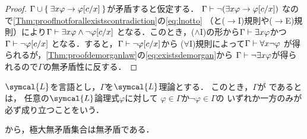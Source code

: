 \begin{proof}
	\(\Gamma \cup \Set{\exists x \varphi \to \subst{\varphi}{c/x}}\)が矛盾すると仮定する．
	\(\Gamma \provable \lnot \paren{\exists x \varphi \to \subst{\varphi}{c/x}}\)
	なので\cref{Thm:prooflnotforallexistscontradiction}の\cref{eq:lnotto}
	（と(\(\to\)I)規則や(\(\to\)E)規則）により\(\Gamma \provable \exists x \varphi \land \lnot \subst{\varphi}{c/x}\)
	となる．このとき，(\(\land\)I)の形から\(\Gamma \vdash \exists x \varphi\)かつ\(\Gamma \provable \lnot \subst{\varphi}{c/x}\)
	となる．すると，\(\Gamma \provable \lnot \subst{\varphi}{c/x}\)から
	(\(\forall\)I)規則によって\(\Gamma \vdash \forall x \lnot \varphi\)
	が得られるが，\cref{Thm:proofdemorganlaw}の\cref{eq:existsdemorgan}から
	\(\Gamma \vdash \lnot \exists x \varphi\)が得られるので\(\Gamma\)の無矛盾性に反する．
\end{proof}

\begin{Def} \label{Def:maximumconsistency}
	\(\symcal{L}\)を言語とし，\(\Gamma\)を\(\symcal{L}\)理論とする．
	このとき，\(\Gamma\)が%
	であるとは，
	任意の\(\symcal{L}\)論理式\(\varphi\)に対して
	\(\varphi \in \Gamma\)か\(\lnot \varphi \in \Gamma\)の
	いずれか一方のみが必ず成り立つことをいう．

	から，極大無矛盾集合は無矛盾である．
\end{Def}


